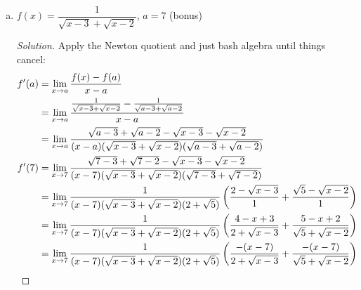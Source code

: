 \documentclass{agony}
\begin{document}
\begin{enumerate}[(a)]
\begin{proof}[Solution]
\begin{align*}
                   & = \lim_{x\to-3}\frac{\frac{3}{x^2+7}-\frac{3}{(-3)^2+7}}{x+3} \\
                   & = \lim_{x\to-3}\frac{27+7-3x^2-7}{16(x+3)(x^2+7)}             \\
                   & = -\frac{3}{16}\lim_{x\to-3}\frac{x^2-9}{(x+3)(x^2+7)}        \\
                   & = -\frac{3}{16}\lim_{x\to-3}\frac{(x-3)(x+3)}{(x+3)(x^2+7)}   \\
                   & = -\frac{3}{16}\lim_{x\to-3}\frac{x-3}{x^2+7}                 \\
                   & = \frac{9}{128} \qedhere
          \end{align*}
        \end{proof}
  \item $f(x) = \dfrac{1}{\sqrt{x-3}+\sqrt{x-2}}$, $a=7$ (bonus)
        \begin{proof}[Solution]
          Apply the Newton quotient and just bash algebra until things cancel:
          \begin{align*}
            f'(a) & = \dlim{x}{a}\frac{f(x)-f(a)}{x-a}                                                                                   \\
                  & = \dlim{x}{a}\frac{\frac{1}{\sqrt{x-3}+\sqrt{x-2}}-\frac{1}{\sqrt{a-3}+\sqrt{a-2}}}{x-a}                             \\
                  & = \dlim{x}{a}\frac{\sqrt{a-3}+\sqrt{a-2}-\sqrt{x-3}-\sqrt{x-2}}{(x-a)(\sqrt{x-3}+\sqrt{x-2})(\sqrt{a-3}+\sqrt{a-2})} \\
            f'(7) & = \dlim{x}{7}\frac{\sqrt{7-3}+\sqrt{7-2}-\sqrt{x-3}-\sqrt{x-2}}{(x-7)(\sqrt{x-3}+\sqrt{x-2})(\sqrt{7-3}+\sqrt{7-2})} \\
                  & = \dlim{x}{7}\frac{1}{(x-7)(\sqrt{x-3}+\sqrt{x-2})(2+\sqrt{5})}
            \left( \frac{2-\sqrt{x-3}}{1} + \frac{\sqrt{5}-\sqrt{x-2}}{1} \right)                                                        \\
                  & = \dlim{x}{7}\frac{1}{(x-7)(\sqrt{x-3}+\sqrt{x-2})(2+\sqrt{5})}
            \left( \frac{4-x+3}{2+\sqrt{x-3}} + \frac{5-x+2}{\sqrt{5}+\sqrt{x-2}} \right)                                                \\
                  & = \dlim{x}{7}\frac{1}{(x-7)(\sqrt{x-3}+\sqrt{x-2})(2+\sqrt{5})}
            \left( \frac{-(x-7)}{2+\sqrt{x-3}} + \frac{-(x-7)}{\sqrt{5}+\sqrt{x-2}} \right)                                              \\

\end{align*}
\end{proof}
\end{enumerate}
\end{document}
